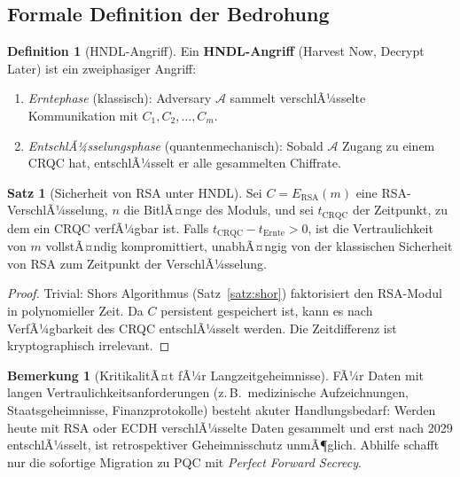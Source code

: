 ﻿\documentclass[a4paper,12pt]{article}
\theoremstyle{definition}
\newtheorem{definition}{Definition}[section]
\newtheorem{bemerkung}{Bemerkung}[section]
\newtheorem{satz}{Satz}[section]
\begin{document}
\subsection{Formale Definition der Bedrohung}

\begin{definition}[HNDL-Angriff]
Ein \textbf{HNDL-Angriff} (Harvest Now, Decrypt Later) ist ein zweiphasiger Angriff:
\begin{enumerate}
\item \emph{Erntephase} (klassisch): Adversary $\mathcal{A}$ sammelt
  verschlÃ¼sselte Kommunikation mit $C_1, C_2, \ldots, C_m$.
\item \emph{EntschlÃ¼sselungsphase} (quantenmechanisch): Sobald $\mathcal{A}$
  Zugang zu einem CRQC hat, entschlÃ¼sselt er alle gesammelten Chiffrate.
\end{enumerate}
\end{definition}

\begin{satz}[Sicherheit von RSA unter HNDL]
Sei $C = E_\mathrm{RSA}(m)$ eine RSA-VerschlÃ¼sselung, $n$ die BitlÃ¤nge des Moduls,
und sei $t_\mathrm{CRQC}$ der Zeitpunkt, zu dem ein CRQC verfÃ¼gbar ist.
Falls $t_\mathrm{CRQC} - t_\mathrm{Ernte} > 0$, ist die Vertraulichkeit von $m$
vollstÃ¤ndig kompromittiert, unabhÃ¤ngig von der klassischen Sicherheit von RSA
zum Zeitpunkt der VerschlÃ¼sselung.
\end{satz}

\begin{proof}
Trivial: Shors Algorithmus (Satz~\ref{satz:shor}) faktorisiert den RSA-Modul
in polynomieller Zeit. Da $C$ persistent gespeichert ist, kann es nach VerfÃ¼gbarkeit
des CRQC entschlÃ¼sselt werden. Die Zeitdifferenz ist kryptographisch irrelevant.
\end{proof}

\begin{bemerkung}[KritikalitÃ¤t fÃ¼r Langzeitgeheimnisse]
FÃ¼r Daten mit langen Vertraulichkeitsanforderungen (z.\,B.\ medizinische
Aufzeichnungen, Staatsgeheimnisse, Finanzprotokolle) besteht akuter Handlungsbedarf:
Werden heute mit RSA oder ECDH verschlÃ¼sselte Daten gesammelt und erst
nach 2029 entschlÃ¼sselt, ist retrospektiver Geheimnisschutz unmÃ¶glich.
Abhilfe schafft nur die sofortige Migration zu PQC mit \emph{Perfect Forward Secrecy}.
\end{bemerkung}
\end{document}
